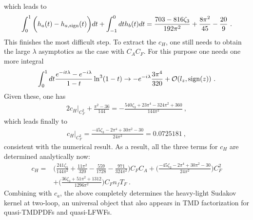 \documentclass[a4paper,11pt]{article}
\begin{document}
which leads to
\begin{align}
\int_{0}^1 \bigg(h_{a}(t)-h_{a,{\rm sign}}(t)\bigg) dt+\int_{-1}^0 dt h_b(t) dt =\frac{703-816 \zeta_3}{192 \pi ^2}+\frac{8 \pi ^2}{45}-\frac{20}{9} \ .
\end{align}
This finishes the most difficult step. To extract the $c_H$, one still needs to obtain the large $\lambda$ asymptotics as the case with $C_{A}C_F$. For this purpose one needs one more integral
\begin{align}
\int_{0}^1 dt \frac{e^{-it\lambda}-e^{-i\lambda}}{1-t}\ln^3(1-t)\rightarrow -e^{-i\lambda}\frac{3\pi^4}{320}+{\cal O}(l_z,{\rm sign}(z)) \ .
\end{align}
Given these, one has
\begin{align}
2c_H|_{C_F^2}+\frac{\pi^2-36}{144}=-\frac{540 \zeta_3+23 \pi ^4-324 \pi ^2+360}{144 \pi ^2} \ ,
\end{align}
which leads finally to 
\begin{align}
c_H|_{C_F^2}=\frac{-45 \zeta_3-2 \pi ^4+30 \pi ^2-30}{24 \pi ^2}=0.0725181 \ ,
\end{align}
consistent with the numerical result. As a result, all the three terms for $c_H$ are determined analytically now:
\begin{align}
c_H=&\bigg(\frac{241 \zeta_3}{144 \pi ^2}+\frac{11 \pi ^2}{320}-\frac{559}{1728}-\frac{971}{324 \pi ^2}\bigg)C_FC_A+\bigg(\frac{-45 \zeta_3-2 \pi ^4+30 \pi ^2-30}{24 \pi ^2}\bigg)C_F^2 \nonumber \\ 
&+\bigg(\frac{36 \zeta_3+51 \pi ^2+1312}{1296 \pi ^2}\bigg)C_Fn_fT_F \ .
\end{align}
Combining with $c_a$, the above completely determines the heavy-light Sudakov kernel at two-loop, an universal object that also appears in TMD factorization for quasi-TMDPDFs and quasi-LFWFs.
\end{document}
